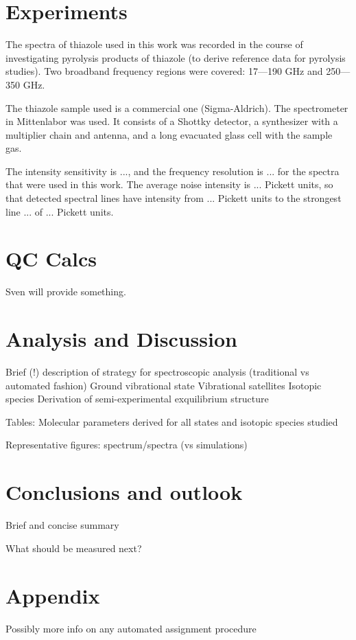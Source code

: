 \documentclass[a4paper]{article}
\begin{document}
\section{Experiments}

The spectra of thiazole used in this work was recorded in the course of investigating pyrolysis products of thiazole (to derive reference data for pyrolysis studies). Two  broadband frequency regions were covered: 17—190 GHz and 250—350 GHz. 

The thiazole sample used is a commercial one (Sigma-Aldrich). The spectrometer in Mittenlabor was used. It consists of a Shottky detector, a synthesizer with a multiplier chain and antenna, and a long evacuated glass cell with the sample gas.

The intensity sensitivity is ..., and the frequency resolution is ... for the spectra that were used in this work. The average noise intensity is ... Pickett units, so that detected spectral lines have intensity from ... Pickett units to the strongest line ... of ... Pickett units.

\section{QC Calcs}

Sven will provide something.

\section{Analysis and Discussion}

Brief (!) description of strategy for spectroscopic analysis (traditional vs automated fashion)
Ground vibrational state
Vibrational satellites
Isotopic species
Derivation of semi-experimental exquilibrium structure

Tables: Molecular parameters derived for all states and isotopic species studied

Representative figures: spectrum/spectra (vs simulations)

\section{Conclusions and outlook}

Brief and concise summary

What should be measured next?

\section{Appendix}
Possibly more info on any automated assignment procedure
\end{document}
